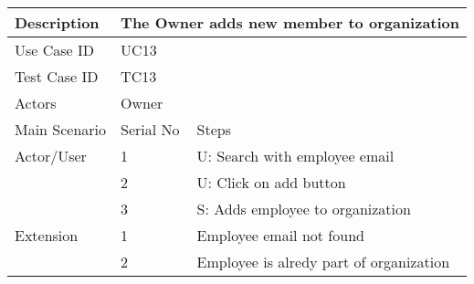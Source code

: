 \begin{table}[]
    \centering
    \begin{tabular}{|l|llll|}
        \hline
        Description   & \multicolumn{4}{l|}{The Owner adds new member to organization}                                                                \\ \hline
        Use Case ID   & \multicolumn{4}{l|}{UC13}                                                                                                     \\ \hline
        Test Case ID  & \multicolumn{4}{l|}{TC13}                                                                                                     \\ \hline
        Actors        & \multicolumn{4}{l|}{Owner}                                                                                                    \\ \hline
        Main Scenario & \multicolumn{1}{l|}{Serial No}                                 & \multicolumn{3}{l|}{Steps}                                   \\ \hline
        Actor/User    & \multicolumn{1}{l|}{1}                                         & \multicolumn{3}{l|}{U: Search with employee email}           \\ \hline
                      & \multicolumn{1}{l|}{2}                                         & \multicolumn{3}{l|}{U: Click on add button}                  \\ \hline
                      & \multicolumn{1}{l|}{3}                                         & \multicolumn{3}{l|}{S: Adds employee to organization}        \\ \hline
        Extension     & \multicolumn{1}{l|}{1}                                         & \multicolumn{3}{l|}{Employee email not found}                \\ \hline
                      & \multicolumn{1}{l|}{2}                                         & \multicolumn{3}{l|}{Employee is alredy part of organization} \\ \hline
    \end{tabular}
\end{table}
\newpage

